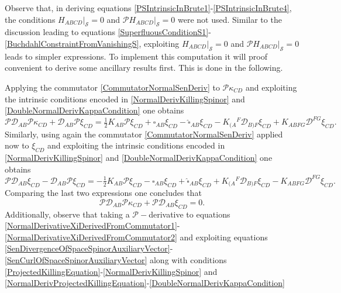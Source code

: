 \documentclass[10pt,a4paper]{article}
\theoremstyle{plain}
\begin{document}
\noindent Observe that, in deriving equations
\eqref{PSIntrinsicInBrute1}-\eqref{PSIntrinsicInBrute4}, the
conditions $H_{ABCD}|_{\mathcal{S}}=0$ and
$\mathcal{P}H_{ABCD}|_{\mathcal{S}}=0$ were not used.  Similar to the
discussion leading to equations
\eqref{SuperfluousConditionS1}-\eqref{BuchdahlConstraintFromVanishingS},
exploiting $H_{ABCD}|_{\mathcal{S}}=0$ and
$\mathcal{P}H_{ABCD}|_{\mathcal{S}}=0$ leads to simpler
expressions. To implement this computation it will proof convenient to
derive some ancillary results first. This is done in
the following.

\medskip

Applying the commutator \eqref{CommutatorNormalSenDeriv} to
$\mathcal{P}\kappa_{CD}$ and exploiting the intrinsic conditions
encoded in \eqref{NormalDerivKillingSpinor} and
\eqref{DoubleNormalDerivKappaCondition} one obtains
\begin{equation*}
\mathcal{P}\mathcal{D}_{AB}\mathcal{P}\kappa_{CD} +
\mathcal{D}_{AB}\mathcal{P}\xi_{CD}
=\tfrac{1}{2}K_{AB}\mathcal{P}\xi_{CD}+\square_{AB}\xi_{CD}-\widehat{\square}_{AB}\xi_{CD}
-K_{(A}{}^{F}\mathcal{D}_{B)F}\xi_{CD} +
K_{ABFG}\mathcal{D}^{FG}\xi_{CD}.
\end{equation*}
Similarly, using again the commutator \eqref{CommutatorNormalSenDeriv}
applied now to $\xi_{CD}$ and exploiting the intrinsic conditions
encoded in \eqref{NormalDerivKillingSpinor} and
\eqref{DoubleNormalDerivKappaCondition} one obtains
\begin{equation*}
\mathcal{P}\mathcal{D}_{AB}\xi_{CD} -
\mathcal{D}_{AB}\mathcal{P}\xi_{CD}
=-\tfrac{1}{2}K_{AB}\mathcal{P}\xi_{CD}-\square_{AB}\xi_{CD}+\widehat{\square}_{AB}\xi_{CD}
+K_{(A}{}^{F}\mathcal{D}_{B)F}\xi_{CD} -
K_{ABFG}\mathcal{D}^{FG}\xi_{CD}.
\end{equation*}
Comparing the last two expressions one concludes that
\begin{equation}
 \mathcal{P}\mathcal{D}_{AB}\mathcal{P}\kappa_{CD}+\mathcal{P}\mathcal{D}_{AB}\xi_{CD}=0.
\label{NotObviousExpressionForThirdDerivatives}
\end{equation}
Additionally, observe that taking a $\mathcal{P}-$derivative to
equations
\eqref{NormalDerivativeXiDerivedFromCommutator1}-\eqref{NormalDerivativeXiDerivedFromCommutator2}
and exploiting equations
\eqref{SenDivergenceOfSpaceSpinorAuxiliaryVector}-\eqref{SenCurlOfSpaceSpinorAuxiliaryVector}
along with conditions
\eqref{ProjectedKillingEquation}-\eqref{NormalDerivKillingSpinor} and
\eqref{NormalDerivProjectedKillingEquation}-\eqref{DoubleNormalDerivKappaCondition}
\end{document}
